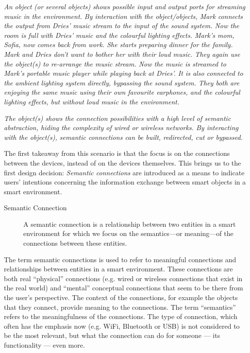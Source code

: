 \emph{An object (or several objects) shows possible input and output ports for streaming music in the environment. By interaction with the object/objects, Mark connects the output from Dries' music stream to the input of the sound system. Now the room is full with Dries' music and the colourful lighting effects. Mark's mom, Sofia, now comes back from work. She starts preparing dinner for the family. Mark and Dries don't want to bother her with their loud music. They again use the object(s) to re-arrange the music stream. Now the music is streamed to Mark's portable music player while playing back at Dries'. It is also connected to the ambient lighting system directly, bypassing the sound system. They both are enjoying the same music using their own favourite earphones, and the colourful lighting effects, but without loud music in the environment.}

\emph{The object(s) shows the connection possibilities with a high level of semantic abstraction, hiding the complexity of wired or wireless networks. By interacting with the object(s), semantic connections can be built, redirected, cut or bypassed.}

The first takeaway from this scenario is that the focus is on the connections between the devices, instead of on the devices themselves. This brings us to the first design decision: \emph{Semantic connections} are introduced as a means to indicate users' intentions concerning the information exchange between smart objects in a smart environment. 


\begin{description}
	\item [Semantic Connection] A semantic connection is a relationship between two entities in a smart environment for which we focus on the semantics---or meaning---of the connections between these entities. 
\end{description}

The term semantic connections is used to refer to meaningful connections and relationships between entities in a smart environment. These connections are both real ``physical'' connections (e.g. wired or wireless connections that exist in the real world) and ``mental'' conceptual connections that seem to be there from the user's perspective. The context of the connections, for example the objects that they connect, provide meaning to the connections. The term ``semantics'' refers to the meaningfulness of the connections. The type of connection, which often has the emphasis now (e.g. WiFi, Bluetooth or USB) is not considered to be the most relevant, but what the connection can do for someone --- its functionality --- even more.

